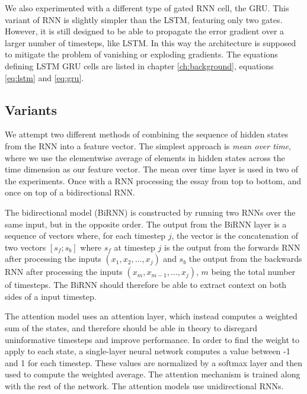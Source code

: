 We also experimented with a different type of gated \ac{RNN} cell, the
\ac{GRU}. This variant of \ac{RNN} is slightly simpler than the \ac{LSTM},
featuring only two gates. However, it is still designed to be able to
propagate the error gradient over a larger number of timesteps, like
\ac{LSTM}. In this way the architecture is supposed to mitigate the problem
of vanishing or exploding gradients. The equations defining \ac{LSTM}
\ac{GRU} cells are listed in chapter \ref{ch:background}, equations
\ref{eq:lstm} and \ref{eq:gru}.


\subsection{Variants}

We attempt two different methods of combining the sequence of hidden states
from the \ac{RNN} into a feature vector. The simplest approach is \emph{mean
over time}, where we use the elementwise average of elements in hidden states
across the time dimension as our feature vector. The mean over time layer is
used in two of the experiments. Once with a \ac{RNN} processing the essay
from top to bottom, and once on top of a bidirectional RNN.

The bidirectional model (BiRNN) is constructed by running two \acp{RNN} over
the same input, but in the opposite order. The output from the BiRNN layer is
a sequence of vectors where, for each timestep $j$, the vector is the
concatenation of two vectors $[s_f;s_b]$ where $s_f$ at timestep $j$ is the
output from the forwards \ac{RNN} after processing the inputs $(x_1, x_2,
\ldots, x_j)$ and $s_b$ the output from the backwards \ac{RNN} after
processing the inputs $(x_m, x_{m-1}, \ldots, x_j)$, $m$ being the total
number of timesteps. The BiRNN should therefore be able to extract context on
both sides of a input timestep.


The attention model uses an attention layer, which instead computes a
weighted sum of the states, and therefore should be able in theory to
disregard uninformative timesteps and improve performance. In order to find
the weight to apply to each state, a single-layer neural network computes a
value between -1 and 1 for each timestep. These values are normalized by a
softmax layer and then used to compute the weighted average. The attention
mechanism is trained along with the rest of the network. The attention models
use unidirectional \acp{RNN}.

